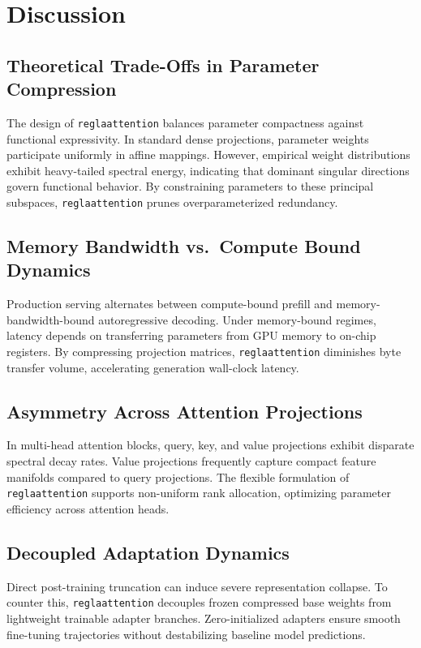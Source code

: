 \section{Discussion}

\subsection{Theoretical Trade-Offs in Parameter Compression}
The design of \texttt{reglaattention} balances parameter compactness against functional expressivity. In standard dense projections, parameter weights participate uniformly in affine mappings. However, empirical weight distributions exhibit heavy-tailed spectral energy, indicating that dominant singular directions govern functional behavior. By constraining parameters to these principal subspaces, \texttt{reglaattention} prunes overparameterized redundancy.

\subsection{Memory Bandwidth vs.\ Compute Bound Dynamics}
Production serving alternates between compute-bound prefill and memory-bandwidth-bound autoregressive decoding. Under memory-bound regimes, latency depends on transferring parameters from GPU memory to on-chip registers. By compressing projection matrices, \texttt{reglaattention} diminishes byte transfer volume, accelerating generation wall-clock latency.

\subsection{Asymmetry Across Attention Projections}
In multi-head attention blocks, query, key, and value projections exhibit disparate spectral decay rates. Value projections frequently capture compact feature manifolds compared to query projections. The flexible formulation of \texttt{reglaattention} supports non-uniform rank allocation, optimizing parameter efficiency across attention heads.

\subsection{Decoupled Adaptation Dynamics}
Direct post-training truncation can induce severe representation collapse. To counter this, \texttt{reglaattention} decouples frozen compressed base weights from lightweight trainable adapter branches. Zero-initialized adapters ensure smooth fine-tuning trajectories without destabilizing baseline model predictions.

